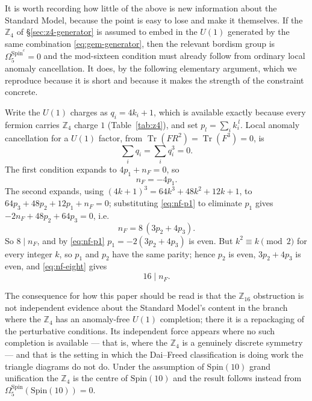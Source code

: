 \documentclass[aps,prd,reprint,nofootinbib,superscriptaddress]{revtex4-2}
\begin{document}
It is worth recording how little of the above is new information about
the Standard Model, because the point is easy to lose and
\cite{GarciaEtxebarria2019} make it themselves. If the $\mathbb{Z}_4$ of
\S\ref{sec:z4-generator} is assumed to embed in the $U(1)$ generated by
the same combination \eqref{eq:gem-generator}, then the relevant bordism
group is $\Omega_5^{\mathrm{Spin}^c} = 0$ and the mod-sixteen condition
must already follow from ordinary local anomaly cancellation. It does,
by the following elementary argument, which we reproduce because it is
short and because it makes the strength of the constraint concrete.

Write the $U(1)$ charges as $q_i = 4k_i + 1$, which is available exactly
because every fermion carries $\mathbb{Z}_4$ charge $1$
(Table~\ref{tab:z4}), and set $p_l = \sum_i k_i^{\,l}$. Local anomaly
cancellation for a $U(1)$ factor, from
$\operatorname{Tr}(F R^2) = \operatorname{Tr}(F^3) = 0$, is
\begin{equation}
\sum_i q_i = \sum_i q_i^3 = 0 .
\label{eq:local-anomaly}
\end{equation}
The first condition expands to $4p_1 + n_F = 0$, so
\begin{equation}
n_F = -4 p_1 .
\label{eq:nf-p1}
\end{equation}
The second expands, using $(4k+1)^3 = 64k^3 + 48k^2 + 12k + 1$, to
$64 p_3 + 48 p_2 + 12 p_1 + n_F = 0$; substituting \eqref{eq:nf-p1} to
eliminate $p_1$ gives $-2 n_F + 48 p_2 + 64 p_3 = 0$, i.e.
\begin{equation}
n_F = 8\,(3 p_2 + 4 p_3) .
\label{eq:nf-eight}
\end{equation}
So $8 \mid n_F$, and by \eqref{eq:nf-p1} $p_1 = -2(3p_2 + 4p_3)$ is even.
But $k^2 \equiv k \pmod 2$ for every integer $k$, so $p_1$ and $p_2$ have
the same parity; hence $p_2$ is even, $3p_2 + 4p_3$ is even, and
\eqref{eq:nf-eight} gives
\begin{equation}
16 \mid n_F .
\end{equation}

The consequence for how this paper should be read is that the
$\mathbb{Z}_{16}$ obstruction is not independent evidence about the
Standard Model's content in the branch where the $\mathbb{Z}_4$ has an
anomaly-free $U(1)$ completion; there it is a repackaging of the
perturbative conditions. Its independent force appears where no such
completion is available --- that is, where the $\mathbb{Z}_4$ is a
genuinely discrete symmetry --- and that is the setting in which the
Dai--Freed classification is doing work the triangle diagrams do not do.
Under the assumption of $\mathrm{Spin}(10)$ grand unification the
$\mathbb{Z}_4$ is the centre of $\mathrm{Spin}(10)$ and the result
follows instead from $\Omega_5^{\mathrm{Spin}}(\mathrm{Spin}(10)) = 0$.
\end{document}
